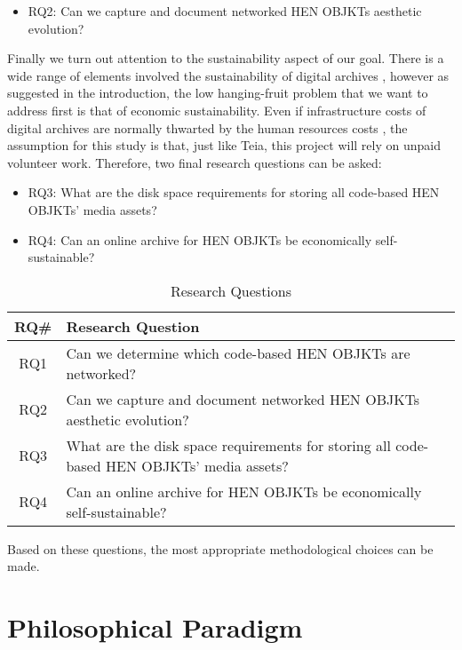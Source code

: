 \begin{itemize}
	\item RQ2: Can we capture and document networked HEN OBJKTs aesthetic evolution?
\end{itemize}

Finally we turn out attention to the sustainability aspect of our goal. There is a wide range of elements involved the sustainability of digital archives \cite{visDigitalArchivingSustainable2024}, however as suggested in the introduction, the low hanging-fruit problem that we want to address first is that of economic sustainability. Even if infrastructure costs of digital archives are normally thwarted by the human resources costs \cite{CostsDigitalRepositories}, the assumption for this study is that, just like Teia, this project will rely on unpaid volunteer work. Therefore, two final research questions can be asked: 

\begin{itemize}
	\item RQ3: What are the disk space requirements for storing all code-based HEN OBJKTs' media assets?
	\item RQ4: Can an online archive for HEN OBJKTs be economically self-sustainable?
\end{itemize}

\vspace{0.5cm}

\begin{table}[h!]
\centering
\footnotesize
\begin{tabular}{|c|p{10cm}|}
\hline
\textbf{RQ\#} & \textbf{Research Question} \\ \hline
RQ1 & Can we determine which code-based HEN OBJKTs are networked? \\ \hline
RQ2 & Can we capture and document networked HEN OBJKTs aesthetic evolution? \\ \hline
RQ3 & What are the disk space requirements for storing all code-based HEN OBJKTs' media assets? \\ \hline
RQ4 & Can an online archive for HEN OBJKTs be economically self-sustainable? \\ \hline
\end{tabular}
\caption{Research Questions}
\end{table}


Based on these questions, the most appropriate methodological choices can be made.

\section{Philosophical Paradigm}

